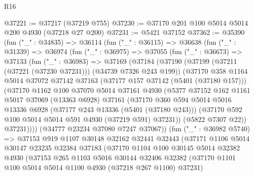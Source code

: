 \begin{lexlean}{R16}
\begin{coremodule}
@37221 := @37217 (@37219 @755)
@37230 := @37170 @201 @100 @5014 @5014 @200 @4930 (@37218 @27 @200)
@37231 := @5421 @37152
@37362 := @35390
    (fun ("_" : @34835) =>
    @36114
      (fun ("_" : @36115) =>
      @36638
        (fun ("_" : @31339) =>
        @36974
          (fun ("_" : @36975) =>
          @37055
            (fun ("_" : @36673) =>
            @37133
              (fun ("_" : @36983) =>
              @37169
                (@37184
                  (@37190
                    (@37199 (@37211 (@37221 (@37230 @37231))) (@34739 @7326 @243 @199))
                    (@37170
                      @358
                      @1164
                      @5014
                      @37072
                      @37142
                      @37163
                      (@37177 @157 @37142 (@5401 (@37180 @157)))
                      (@37170
                        @1162
                        @100
                        @37070
                        @5014
                        @37161
                        @4930
                        (@5377
                          @37152
                          @162
                          @1161
                          @5017
                          @37069
                          (@13363 @6928)
                          @37161
                          (@37170
                            @360
                            @594
                            @5014
                            @5016
                            @13336
                            @6928
                            (@37177 @243 @13336 (@5401 (@37180 @243)))
                            (@37170 @592 @100 @5014 @5014 @591 @4930 (@37219 @591) @37231))
                          (@5822 @7307 @22))
                        @37231))))
                (@34777 @23234 @37080 @7247 @37067))
              (fun ("_" : @36982 @5740) =>
              @37153
                @919
                @1107
                @30148
                @32162
                @32441
                @32443
                (@37171
                  @1106
                  @5014
                  @30147
                  @23235
                  @32384
                  @37183
                  (@37170
                    @1104
                    @100
                    @30145
                    @5014
                    @32382
                    @4930
                    (@37153
                      @265
                      @1103
                      @5016
                      @30144
                      @32406
                      @32382
                      (@37170 @1101 @100 @5014 @5014 @1100 @4930 (@37218 @267 @1100) @37231)

\end{coremodule}
\end{lexlean}
